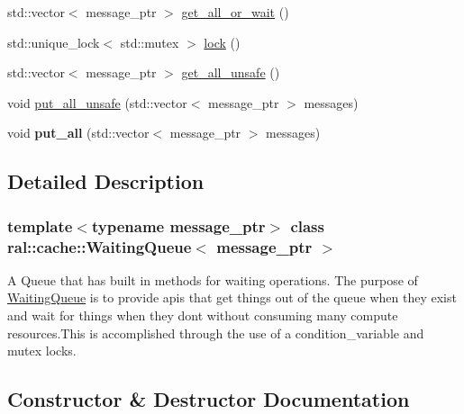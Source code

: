 \begin{DoxyCompactItemize}
\item 
std\+::vector$<$ message\+\_\+ptr $>$ \hyperlink{classral_1_1cache_1_1WaitingQueue_a0f0d4eb7e1d573849af13ede6621f2ac}{get\+\_\+all\+\_\+or\+\_\+wait} ()
\item 
std\+::unique\+\_\+lock$<$ std\+::mutex $>$ \hyperlink{classral_1_1cache_1_1WaitingQueue_ad5ef46c8b24d7de3f2a00c4e6f927e0a}{lock} ()
\item 
std\+::vector$<$ message\+\_\+ptr $>$ \hyperlink{classral_1_1cache_1_1WaitingQueue_a6b0d10905ba8ab60f8d171d494e9ed7a}{get\+\_\+all\+\_\+unsafe} ()
\item 
void \hyperlink{classral_1_1cache_1_1WaitingQueue_a1ac476114c34c127aee7c43907088bea}{put\+\_\+all\+\_\+unsafe} (std\+::vector$<$ message\+\_\+ptr $>$ messages)
\item 
\mbox{\label{classral_1_1cache_1_1WaitingQueue_a523bc3b04a12b26ac57b8c77f0634fb5}} 
void {\bfseries put\+\_\+all} (std\+::vector$<$ message\+\_\+ptr $>$ messages)
\end{DoxyCompactItemize}


\subsection{Detailed Description}
\subsubsection*{template$<$typename message\+\_\+ptr$>$\newline
class ral\+::cache\+::\+Waiting\+Queue$<$ message\+\_\+ptr $>$}

A Queue that has built in methods for waiting operations. The purpose of \hyperlink{classral_1_1cache_1_1WaitingQueue}{Waiting\+Queue} is to provide apis that get things out of the queue when they exist and wait for things when they don\textquotesingle{}t without consuming many compute resources.\+This is accomplished through the use of a condition\+\_\+variable and mutex locks. 

\subsection{Constructor \& Destructor Documentation}
\mbox{\label{classral_1_1cache_1_1WaitingQueue_ac69033b0cfeead472b2b0beeed6de93c}} 
